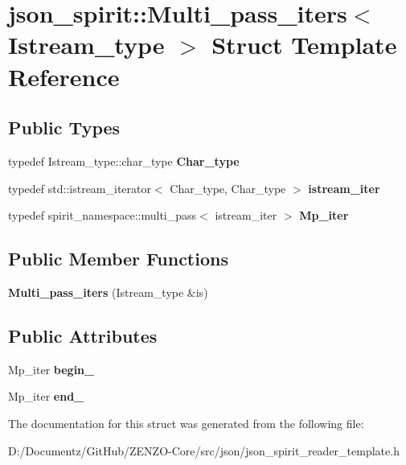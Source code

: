 \hypertarget{structjson__spirit_1_1_multi__pass__iters}{}\section{json\+\_\+spirit\+::Multi\+\_\+pass\+\_\+iters$<$ Istream\+\_\+type $>$ Struct Template Reference}
\label{structjson__spirit_1_1_multi__pass__iters}
\subsection*{Public Types}
\begin{DoxyCompactItemize}
\item 
\mbox{\label{structjson__spirit_1_1_multi__pass__iters_af055928abdd9390a2c64285222b31fc6}} 
typedef Istream\+\_\+type\+::char\+\_\+type {\bfseries Char\+\_\+type}
\item 
\mbox{\label{structjson__spirit_1_1_multi__pass__iters_a93811375311c40a51de7669845cf3bc6}} 
typedef std\+::istream\+\_\+iterator$<$ Char\+\_\+type, Char\+\_\+type $>$ {\bfseries istream\+\_\+iter}
\item 
\mbox{\label{structjson__spirit_1_1_multi__pass__iters_ad2a62bae930a5705b96297264898c7e4}} 
typedef spirit\+\_\+namespace\+::multi\+\_\+pass$<$ istream\+\_\+iter $>$ {\bfseries Mp\+\_\+iter}
\end{DoxyCompactItemize}
\subsection*{Public Member Functions}
\begin{DoxyCompactItemize}
\item 
\mbox{\label{structjson__spirit_1_1_multi__pass__iters_ad7fb4957b367a29e848239936f6387e1}} 
{\bfseries Multi\+\_\+pass\+\_\+iters} (Istream\+\_\+type \&is)
\end{DoxyCompactItemize}
\subsection*{Public Attributes}
\begin{DoxyCompactItemize}
\item 
\mbox{\label{structjson__spirit_1_1_multi__pass__iters_a529ba1f47c74054bff695c277ec3b3b4}} 
Mp\+\_\+iter {\bfseries begin\+\_\+}
\item 
\mbox{\label{structjson__spirit_1_1_multi__pass__iters_afd43bdc90a846d2caa93846a069f9cbe}} 
Mp\+\_\+iter {\bfseries end\+\_\+}
\end{DoxyCompactItemize}


The documentation for this struct was generated from the following file\+:\begin{DoxyCompactItemize}
\item 
D\+:/\+Documentz/\+Git\+Hub/\+Z\+E\+N\+Z\+O-\/\+Core/src/json/json\+\_\+spirit\+\_\+reader\+\_\+template.\+h\end{DoxyCompactItemize}
